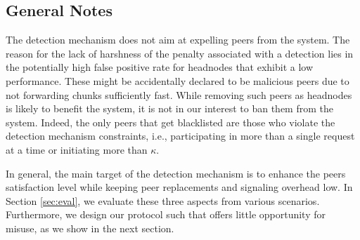 \subsection{General Notes}
The detection mechanism does not aim at expelling peers from the system.
The reason for the lack of harshness of the penalty associated with a detection lies in the potentially high false positive rate for headnodes that exhibit a low performance. 
These might be accidentally declared to be malicious peers due to not forwarding chunks sufficiently fast. 
While removing such peers as headnodes is likely to benefit the system, it is not in our interest to ban them from the system. 
Indeed, the only peers that get blacklisted are those who violate the detection mechanism constraints, i.e., participating in more than a single request at a time or initiating more than $\kappa$.


In general, the main target of the detection mechanism is to enhance the peers satisfaction level while keeping peer replacements and  
signaling overhead low. In Section \ref{sec:eval}, we evaluate these three aspects from various scenarios. 
Furthermore, we design our protocol such that offers little opportunity for misuse, as we show in the next section. 





